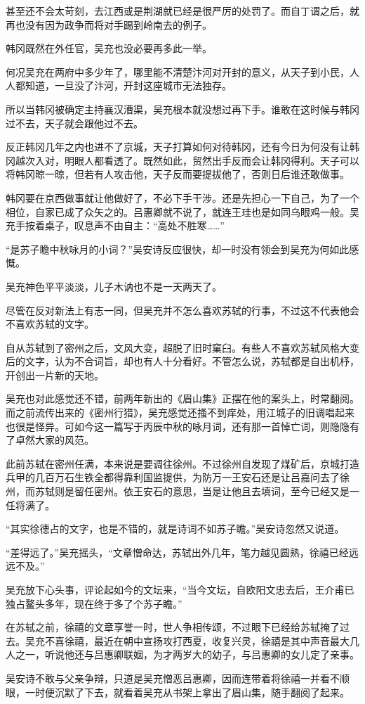 甚至还不会太苛刻，去江西或是荆湖就已经是很严厉的处罚了。而自丁谓之后，就再也没有因为政争而将对手踢到岭南去的例子。

韩冈既然在外任官，吴充也没必要再多此一举。

何况吴充在两府中多少年了，哪里能不清楚汴河对开封的意义，从天子到小民，人人都知道，一旦没了汴河，开封这座城市无法独存。

所以当韩冈被确定主持襄汉漕渠，吴充根本就没想过再下手。谁敢在这时候与韩冈过不去，天子就会跟他过不去。

反正韩冈几年之内也进不了京城，天子打算如何对待韩冈，还有今日为何没有让韩冈越次入对，明眼人都看透了。既然如此，贸然出手反而会让韩冈得利。天子可以将韩冈晾一晾，但若有人攻击他，天子反而要提拔他了，否则日后谁还敢做事。

韩冈要在京西做事就让他做好了，不必下手干涉。还是先担心一下自己，为了一个相位，自家已成了众矢之的。吕惠卿就不说了，就连王珪也是如同乌眼鸡一般。吴充手按着桌子，叹息声不由自主：“高处不胜寒……”

“是苏子瞻中秋咏月的小词？”吴安诗反应很快，却一时没有领会到吴充为何如此感慨。

吴充神色平平淡淡，儿子木讷也不是一天两天了。

尽管在反对新法上有志一同，但吴充并不怎么喜欢苏轼的行事，不过这不代表他会不喜欢苏轼的文字。

自从苏轼到了密州之后，文风大变，超脱了旧时窠臼。有些人不喜欢苏轼风格大变后的文字，认为不合词旨，却也有人十分看好。不管怎么说，苏轼都是自出机杼，开创出一片新的天地。

吴充也对此感觉还不错，前两年新出的《眉山集》正摆在他的案头上，时常翻阅。而之前流传出来的《密州行猎》，吴充感觉还搔不到痒处，用江城子的旧调唱起来也很是怪异。可如今这一篇写于丙辰中秋的咏月词，还有那一首悼亡词，则隐隐有了卓然大家的风范。

此前苏轼在密州任满，本来说是要调往徐州。不过徐州自发现了煤矿后，京城打造兵甲的几百万石生铁全都得靠利国监提供，为防万一王安石还是让吕嘉问去了徐州，而苏轼则是留任密州。依王安石的意思，当是让他且去填词，至今已经又是一任将满了。

“其实徐德占的文字，也是不错的，就是诗词不如苏子瞻。”吴安诗忽然又说道。

“差得远了。”吴充摇头，“文章憎命达，苏轼出外几年，笔力越见圆熟，徐禧已经远远不及。”

吴充放下心头事，评论起如今的文坛来，“当今文坛，自欧阳文忠去后，王介甫已独占鳌头多年，现在终于多了个苏子瞻。”

在苏轼之前，徐禧的文章享誉一时，世人争相传颂，不过眼下已经给苏轼掩了过去。吴充不喜徐禧，最近在朝中宣扬攻打西夏，收复兴灵，徐禧是其中声音最大几人之一，听说他还与吕惠卿联姻，为才两岁大的幼子，与吕惠卿的女儿定了亲事。

吴安诗不敢与父亲争辩，只道是吴充憎恶吕惠卿，因而连带着将徐禧一并看不顺眼，一时便沉默了下去，就看着吴充从书架上拿出了眉山集，随手翻阅了起来。


